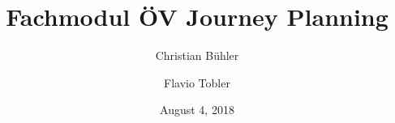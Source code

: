 \title{Fachmodul ÖV Journey Planning}
\date{August 4, 2018}
\author{ Christian Bühler \and Flavio Tobler}

\maketitle